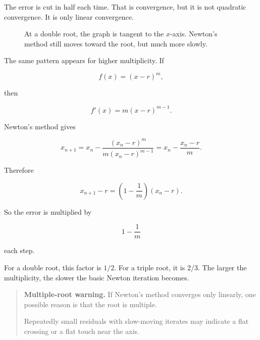 The error is cut in half each time.  That is convergence, but it is not quadratic
convergence.  It is only linear convergence.

\begin{figure}[h]
\centering
{}
\caption{At a double root, the graph is tangent to the \(x\)-axis.  Newton's method still moves toward the root, but much more slowly.}
\label{fig:newton-double-root}
\end{figure}

The same pattern appears for higher multiplicity.  If

\[
f(x)=(x-r)^m,
\]

then

\[
f'(x)=m(x-r)^{m-1}.
\]

Newton's method gives

\[
x_{n+1}
=
x_n-\frac{(x_n-r)^m}{m(x_n-r)^{m-1}}
=
x_n-\frac{x_n-r}{m}.
\]

Therefore

\[
x_{n+1}-r
=
\left(1-\frac1m\right)(x_n-r).
\]

So the error is multiplied by

\[
1-\frac1m
\]

each step.

For a double root, this factor is \(1/2\).  For a triple root, it is \(2/3\).  The larger the
multiplicity, the slower the basic Newton iteration becomes.

\begin{quote}
\textbf{Multiple-root warning.}
If Newton's method converges only linearly, one possible reason is that the root is
multiple.

Repeatedly small residuals with slow-moving iterates may indicate a flat crossing or
a flat touch near the axis.
\end{quote}

